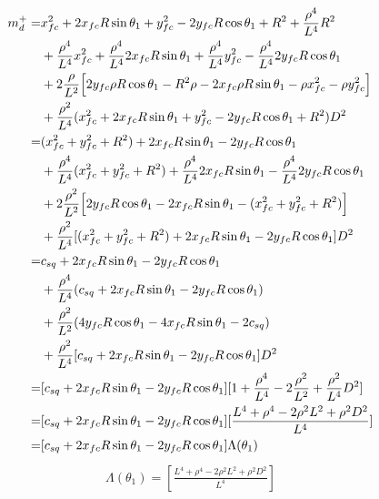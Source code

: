 \documentclass[12pt]{article}
\begin{document}
\begin{align}
    m_d^+=& x_{fc}^2 +2x_{fc}R\sin\theta_1 + y_{fc}^2 -2y_{fc}R\cos\theta_1 + R^2 + \frac{\rho^4}{L^4}R^2 \nonumber\\
    &+   \frac{\rho^4}{L^4}x_{fc}^2 + \frac{\rho^4}{L^4}2x_{fc}R\sin\theta_1 + \frac{\rho^4}{L^4}y_{fc}^2 -\frac{\rho^4}{L^4}2y_{fc}R\cos\theta_1 \nonumber\\
    &+ 2\frac{\rho}{L^2}\Bigl[ 2y_{fc}\rho R\cos\theta_1 -R^2\rho - 2 x_{fc}\rho R\sin\theta_1 -\rho x_{fc}^2 -\rho y_{fc}^2 \Bigr] \nonumber\\
    &+\frac{\rho^2}{L^4}(x_{fc}^2 + 2x_{fc}R\sin\theta_1 + y_{fc}^2 -2y_{fc}R\cos\theta_1 +  R^2 )D^2\\
    =& (x_{fc}^2 + y_{fc}^2 + R^2) +2x_{fc}R\sin\theta_1  -2y_{fc}R\cos\theta_1 \nonumber\\
    &+   \frac{\rho^4}{L^4}(x_{fc}^2 +y_{fc}^2 + R^2 )+ \frac{\rho^4}{L^4}2x_{fc}R\sin\theta_1 -\frac{\rho^4}{L^4}2y_{fc}R\cos\theta_1 \nonumber\\
    &+ 2\frac{\rho^2}{L^2}\Bigl[ 2y_{fc} R\cos\theta_1  - 2 x_{fc} R\sin\theta_1 -(x_{fc}^2 + y_{fc}^2 +R^2) \Bigr] \nonumber\\
    &+\frac{\rho^2}{L^4}[ (x_{fc}^2 + y_{fc}^2 + R^2) + 2x_{fc}R\sin\theta_1  -2y_{fc}R\cos\theta_1  ]D^2 \\
    =& c_{sq} +2x_{fc}R\sin\theta_1  -2y_{fc}R\cos\theta_1 \nonumber\\
    &+   \frac{\rho^4}{L^4} (c_{sq} + 2x_{fc}R\sin\theta_1 -2y_{fc}R\cos\theta_1) \nonumber\\
    &+ \frac{\rho^2}{L^2} ( 4y_{fc} R\cos\theta_1  - 4x_{fc} R\sin\theta_1 -2c_{sq} ) \nonumber\\
    &+\frac{\rho^2}{L^4}[ c_{sq} + 2x_{fc}R\sin\theta_1  -2y_{fc}R\cos\theta_1  ]D^2\\
    =& [c_{sq} +2x_{fc}R\sin\theta_1  -2y_{fc}R\cos\theta_1][ 1 + \frac{\rho^4}{L^4} - 2\frac{\rho^2}{L^2} + \frac{\rho^2}{L^4}D^2] \\
    =& [c_{sq} +2x_{fc}R\sin\theta_1  -2y_{fc}R\cos\theta_1][ \frac{L^4 + \rho^4 -2\rho^2L^2 + \rho^2D^2}{L^4}] \\
    =& [c_{sq} +2x_{fc}R\sin\theta_1  -2y_{fc}R\cos\theta_1]\Lambda(\theta_1)
\end{align}
\begin{align}
    \Lambda(\theta_1) = [ \frac{L^4 + \rho^4 -2\rho^2L^2 + \rho^2D^2}{L^4}]
\end{align}
\end{document}
